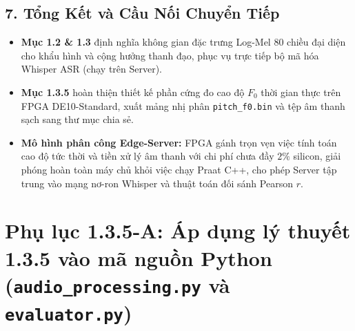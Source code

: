 \documentclass[11pt,a4paper]{article}
\begin{document}
\begin{table}[H]
\centering
\small
{}
\caption{Sổ cái hạch toán tài nguyên silicon cho khối Pitch trên FPGA DE10-Standard.}
\label{tab:silicon_pitch}
\end{table}

\subsection*{7. Tổng Kết và Cầu Nối Chuyển Tiếp}

\begin{itemize}
    \setlength{\itemsep}{0.5pt}
    \item \textbf{Mục 1.2 \& 1.3} định nghĩa không gian đặc trưng Log-Mel 80 chiều đại diện cho khẩu hình và cộng hưởng thanh đạo, phục vụ trực tiếp bộ mã hóa Whisper ASR (chạy trên Server).
    \item \textbf{Mục 1.3.5} hoàn thiện thiết kế phần cứng đo cao độ $F_0$ thời gian thực trên FPGA DE10-Standard, xuất mảng nhị phân \texttt{pitch\_f0.bin} và tệp âm thanh sạch sang thư mục chia sẻ.
    \item \textbf{Mô hình phân công Edge-Server:} FPGA gánh trọn vẹn việc tính toán cao độ tức thời và tiền xử lý âm thanh với chi phí chưa đầy $2\%$ silicon, giải phóng hoàn toàn máy chủ khỏi việc chạy Praat C++, cho phép Server tập trung vào mạng nơ-ron Whisper và thuật toán đối sánh Pearson $r$.
\end{itemize}


\newpage
\section*{Phụ lục 1.3.5-A: Áp dụng lý thuyết 1.3.5 vào mã nguồn Python\\(\texttt{audio\_processing.py} và \texttt{evaluator.py})}
\end{document}
